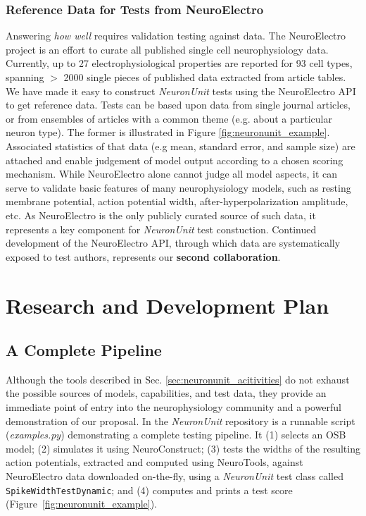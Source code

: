 \documentclass[11pt,letterpaper]{article}
\let\verbx\lstinline
\begin{document}
\subsubsection{Reference Data for Tests from NeuroElectro}
Answering \textit{how well} requires validation testing against data. 
The NeuroElectro project\cite{neuroelectro_url} is an effort to curate all published single cell neurophysiology data\cite{tripathy_neuroelectro:_2012}.  
Currently, up to 27 electrophysiological properties are reported for 93 cell types, spanning $>$ 2000 single pieces of published data extracted from article tables. 
We have made it easy to construct \textit{NeuronUnit} tests using the NeuroElectro API to get reference data. 
Tests can be based upon data from single journal articles, or from ensembles of articles with a common theme (e.g. about a particular neuron type). 
The former is illustrated in Figure \ref{fig:neuronunit_example}. 
Associated statistics of that data (e.g mean, standard error, and sample size) are attached and enable judgement of model output according to a chosen scoring mechanism. 
While NeuroElectro alone cannot judge all model aspects, it can serve to validate basic features of many neurophysiology models, such as resting membrane potential, action potential width, after-hyperpolarization amplitude, etc. 
As NeuroElectro is the only publicly curated source of such data, it represents a key component for \textit{NeuronUnit} test constuction.  
Continued development of the NeuroElectro API, through which data are systematically exposed to test authors, represents our \textbf{second collaboration}\cite{neuroelectro_dev_url}.  

\section{Research and Development Plan}

\subsection{A Complete Pipeline}
Although the tools described in Sec. \ref{sec:neuronunit_acitivities} do not exhaust the possible sources of models, capabilities, and test data, they provide an immediate point of entry into the neurophysiology community and a powerful demonstration of our proposal. 
In the \textit{NeuronUnit} repository\cite{neurounit_url} is a runnable script (\textit{examples.py}) demonstrating a complete testing pipeline. 
It (1) selects an OSB model; 
(2) simulates it using NeuroConstruct; 
(3) tests the widths of the resulting action potentials, extracted and computed using NeuroTools, against NeuroElectro data downloaded on-the-fly, using a \textit{NeuronUnit} test class called \verbx{SpikeWidthTestDynamic}; 
and (4) computes and prints a test score (Figure~\ref{fig:neuronunit_example}).
\end{document}
